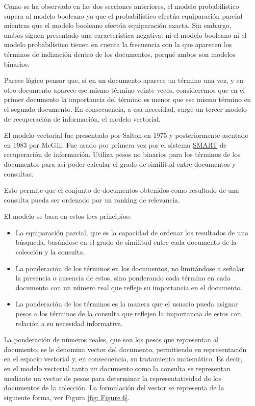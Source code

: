 \documentclass[titlepage]{article}
\begin{document}
	Como se ha observado en las dos secciones anteriores, el modelo probabilístico supera al modelo booleano ya que el probabilístico efectúa equiparación parcial mientras que el modelo booleano efectúa equiparación exacta. Sin embargo, ambos siguen presentado una característica negativa: ni el modelo booleano ni el modelo probabilístico tienen en cuenta la frecuencia con la que aparecen los términos de indización dentro de los documentos, porqué ambos son modelos binarios.
	
	Parece lógico pensar que, si en un documento aparece un término una vez, y en otro documento aparece ese mismo término veinte veces, consideremos que en el primer documento la importancia del término es menor que ese mismo término en el segundo documento. En consecuencia, a esa necesidad, surge un tercer modelo de recuperación de información, el modelo vectorial.
	
	El modelo vectorial fue presentado por Salton\cite{salton} en 1975 y posteriormente asentado en 1983 por McGill\cite{mcgill}. Fue usado por primera vez por el sistema \href{https://en.wikipedia.org/wiki/SMART_Information_Retrieval_System}{SMART} de recuperación de información. Utiliza pesos no binarios para los términos de los documentos para así poder calcular el grado de similitud entre documentos y consultas.  
	
	Esto permite que el conjunto de documentos obtenidos como resultado de una consulta pueda ser ordenado por un ranking de relevancia. 
	
	El modelo se basa en estos tres principios:
	
	\begin{itemize}
		\item La equiparación parcial, que es la capacidad de ordenar los resultados de una búsqueda, basándose en el grado de similitud entre cada documento de la colección y la consulta.
		\item La ponderación de los términos en los documentos, no limitándose a señalar la presencia o ausencia de estos, sino ponderando cada término en cada documento con un número real que refleje su importancia en el documento.
		\item La ponderación de los términos es la manera que el usuario pueda asignar pesos a los términos de la consulta que reflejen la importancia de estos con relación a su necesidad informativa.
	\end{itemize}
	
	La ponderación de números reales, que son los pesos que representan al documento, se le denomina vector del documento, permitiendo su representación en el espacio vectorial y, en consecuencia, su tratamiento matemático. Es decir, en el modelo vectorial tanto un documento como la consulta se representan mediante un vector de pesos para determinar la representatividad de los documentos de la colección. La formulación del vector se representa de la siguiente forma, ver Figura \ref{fig: Figure 6}.
	
\end{document}

